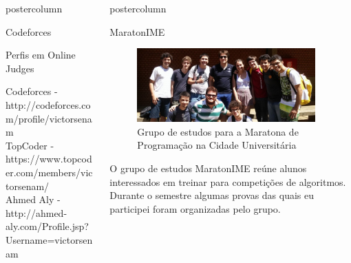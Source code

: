 \documentclass[final]{beamer}
\newlength{\columnheight}
\begin{document}
\begin{frame}
\begin{columns}
\begin{column}{.5\textwidth}
\begin{beamercolorbox}[center,wd=\textwidth]{postercolumn}
\begin{minipage}[T]{.95\textwidth}
{\begin{block}{Codeforces}
        \end{block}

    \begin{block}{Perfis em Online Judges}
    \small
         
    
    Codeforces - http://codeforces.com/profile/victorsenam \\
        TopCoder - https://www.topcoder.com/members/victorsenam/ \\
        Ahmed Aly - http://ahmed-aly.com/Profile.jsp?Username=victorsenam \\
        \end{block}
}
\end{minipage}
\end{beamercolorbox}
\end{column}

\begin{column}{.5\textwidth}
\begin{beamercolorbox}[center,wd=\textwidth]{postercolumn}
\begin{minipage}[T]{.95\textwidth} %
\parbox[t][\columnheight]{\textwidth}{ %

        \begin{block}{MaratonIME}
    \begin{figure}
    \centering
        \includegraphics[width=0.95\textwidth]{maratonime.png}
    \caption{Grupo de estudos para a Maratona de Programação na Cidade Universitária}
    \end{figure} 
    O grupo de estudos MaratonIME reúne alunos interessados em treinar para competições de algoritmos. Durante o semestre algumas provas das quais eu participei foram organizadas pelo grupo.


\end{block}}
\end{minipage}
\end{beamercolorbox}
\end{column}
\end{columns}
\end{frame}
\end{document}
